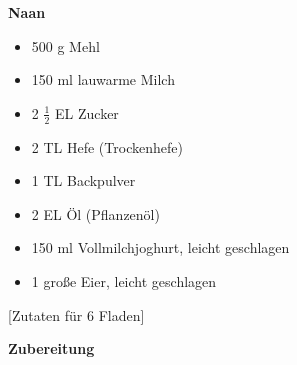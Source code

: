 
\parindent0pt	

\pagestyle{empty}


\textbf{{\LARGE Naan}}%


\hrulefill
\vspace*{\fill}
\begin{multicols}{2}	


\begin{itemize}
\item 500 g 	Mehl
\item 150 ml 	lauwarme Milch
\item 2 $\frac{1}{2}$ EL Zucker
\item 2 TL 	Hefe (Trockenhefe)
\item 1 TL 	Backpulver
\item 2 EL 	Öl (Pflanzenöl)
\item 150 ml 	Vollmilchjoghurt, leicht geschlagen
\item 1 große 	Eier, leicht geschlagen

\end{itemize}

\end{multicols}

\vspace{1cm}
\begin{center}
[Zutaten für 6 Fladen]
\end{center}


\vfill
\newpage
\textbf{{\LARGE Zubereitung}}%

\hrulefill

